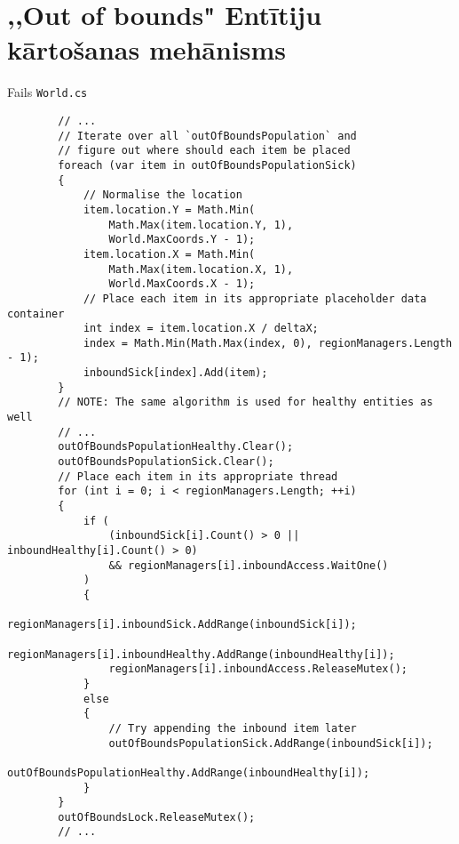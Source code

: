 \section{,,Out of bounds" Entītiju kārtošanas mehānisms }
\label{app:out-of-bounds-sorting}
Fails \texttt{World.cs}
{
    \begin{verbatim}
        // ...
        // Iterate over all `outOfBoundsPopulation` and
        // figure out where should each item be placed
        foreach (var item in outOfBoundsPopulationSick)
        {
            // Normalise the location
            item.location.Y = Math.Min(
                Math.Max(item.location.Y, 1),
                World.MaxCoords.Y - 1);
            item.location.X = Math.Min(
                Math.Max(item.location.X, 1),
                World.MaxCoords.X - 1);
            // Place each item in its appropriate placeholder data container
            int index = item.location.X / deltaX;
            index = Math.Min(Math.Max(index, 0), regionManagers.Length - 1);
            inboundSick[index].Add(item);
        }
        // NOTE: The same algorithm is used for healthy entities as well
        // ...
        outOfBoundsPopulationHealthy.Clear();
        outOfBoundsPopulationSick.Clear();
        // Place each item in its appropriate thread
        for (int i = 0; i < regionManagers.Length; ++i)
        {
            if (
                (inboundSick[i].Count() > 0 || inboundHealthy[i].Count() > 0)
                && regionManagers[i].inboundAccess.WaitOne()
            )
            {
                regionManagers[i].inboundSick.AddRange(inboundSick[i]);
                regionManagers[i].inboundHealthy.AddRange(inboundHealthy[i]);
                regionManagers[i].inboundAccess.ReleaseMutex();
            }
            else
            {
                // Try appending the inbound item later
                outOfBoundsPopulationSick.AddRange(inboundSick[i]);
                outOfBoundsPopulationHealthy.AddRange(inboundHealthy[i]);
            }
        }
        outOfBoundsLock.ReleaseMutex();
        // ...
    \end{verbatim}
}



